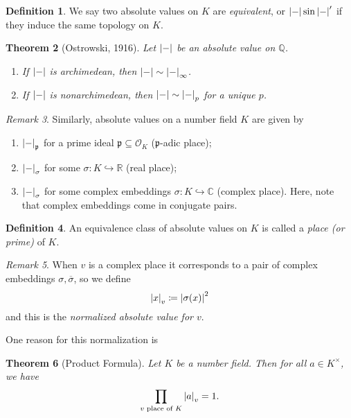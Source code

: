 \documentclass[leqno, openany]{memoir}
\newtheorem{thm}{Theorem}[section]
\theoremstyle{definition}
\newtheorem{defn}[thm]{Definition}
\theoremstyle{remark}
\newtheorem{rmk}[thm]{Remark}
\theoremstyle{plain}
\theoremstyle{definition}
\theoremstyle{remark}
\newcommand{\R}{\mathbb{R}}
\newcommand{\C}{\mathbb{C}}
\newcommand{\Q}{\mathbb{Q}}
\newcommand{\mc}[1]{\mathcal{#1}}
\newcommand{\mf}[1]{\mathfrak{#1}}
\newcommand{\ol}[1]{\overline{#1}}
\begin{document}
\begin{defn}
    We say two absolute values on $K$ are \textit{equivalent}, or $\abs{-} \sin \abs{-}'$ if they induce the same topology on $K$.
\end{defn}

\begin{thm}[Ostrowski, 1916]
    Let $\abs{-}$ be an absolute value on $\Q$.
    \begin{enumerate}
        \item If $\abs{-}$ is archimedean, then $\abs{-} \sim \abs{-}_{\infty}$.
        \item If $\abs{-}$ is nonarchimedean, then $\abs{-} \sim \abs{-}_p$ for a unique $p$.
    \end{enumerate}
\end{thm}

\begin{rmk}
    Similarly, absolute values on a number field $K$ are given by 
    \begin{enumerate}
        \item $\abs{-}_{\mf{p}}$ for a prime ideal $\mf{p} \subseteq \mc{O}_K$ ($\mf{p}$-adic place);
        \item $\abs{-}_{\sigma}$ for some $\sigma \colon K \hookrightarrow \R$ (real place);
        \item $\abs{-}_{\sigma}$ for some complex embeddings $\sigma \colon K \hookrightarrow \C$ (complex place). Here, note that complex embeddings come in conjugate pairs.
    \end{enumerate}
\end{rmk}

\begin{defn}
    An equivalence class of absolute values on $K$ is called a \textit{place (or prime)} of $K$.
\end{defn}

\begin{rmk}
    When $v$ is a complex place it corresponds to a pair of complex embeddings $\sigma, \ol{\sigma}$, so we define 
    \[ \abs{x}_v \coloneqq \abs{\sigma(x)}^2 \]
    and this is the \textit{normalized absolute value for $v$}. 
\end{rmk}

One reason for this normalization is

\begin{thm}[Product Formula]
    Let $K$ be a number field. Then for all $a \in K^{\times}$, we have
    \[ \prod_{v \text{ place of }K} \abs{a}_v = 1. \]
\end{thm}
\end{document}
